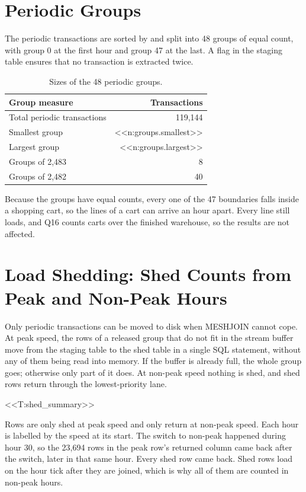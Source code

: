 \documentclass[11pt,a4paper]{article}
\newcommand{\code}[1]{\texttt{\detokenize{#1}}}
\begin{document}
\section{Periodic Groups}

The periodic transactions are sorted by \code{event_time} and split into 48 groups of equal count, with group 0 at the first hour and group 47 at the last. A \code{released} flag in the staging table ensures that no transaction is extracted twice.

\begin{table}[ht]
  \centering
  \caption{Sizes of the 48 periodic groups.}
  \begin{tabular}{lr}
    \toprule
    Group measure & Transactions \\
    \midrule
    Total periodic transactions & 119,144 \\
    Smallest group & <<n:groups.smallest>> \\
    Largest group & <<n:groups.largest>> \\
    Groups of 2,483 & 8 \\
    Groups of 2,482 & 40 \\
    \bottomrule
  \end{tabular}
\end{table}

Because the groups have equal counts, every one of the 47 boundaries falls inside a shopping cart, so the lines of a cart can arrive an hour apart. Every line still loads, and Q16 counts carts over the finished warehouse, so the results are not affected.

\section{Load Shedding: Shed Counts from Peak and Non-Peak Hours}

Only periodic transactions can be moved to disk when MESHJOIN cannot cope. At peak speed, the rows of a released group that do not fit in the stream buffer move from the staging table to the shed table in a single SQL statement, without any of them being read into memory. If the buffer is already full, the whole group goes; otherwise only part of it does. At non-peak speed nothing is shed, and shed rows return through the lowest-priority lane.

<<T:shed_summary>>

Rows are only shed at peak speed and only return at non-peak speed. Each hour is labelled by the speed at its start. The switch to non-peak happened during hour 30, so the 23,694 rows in the peak row's returned column came back after the switch, later in that same hour. Every shed row came back. Shed rows load on the hour tick after they are joined, which is why all of them are counted in non-peak hours.
\end{document}
